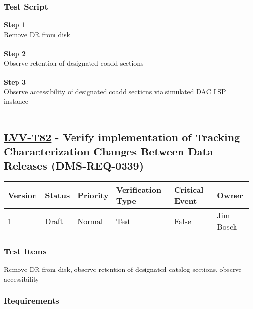 \hypertarget{test-script-171}{%
\subsubsection{Test Script}\label{test-script-171}}

\textbf{Step 1}\\
Remove DR from disk\\
~\\
\textbf{Step 2}\\
Observe retention of designated coadd sections\\
~\\
\textbf{Step 3}\\
Observe accessibility of designated coadd sections via simulated DAC LSP
instance\\
~\\

\hypertarget{lvv-t82---verify-implementation-of-tracking-characterization-changes-between-data-releases-dms-req-0339}{%
\subsection{\texorpdfstring{\href{https://jira.lsstcorp.org/secure/Tests.jspa\#/testCase/LVV-T82}{LVV-T82}
- Verify implementation of Tracking Characterization Changes Between
Data Releases
(DMS-REQ-0339)}{LVV-T82 - Verify implementation of Tracking Characterization Changes Between Data Releases (DMS-REQ-0339)}}\label{lvv-t82---verify-implementation-of-tracking-characterization-changes-between-data-releases-dms-req-0339}}

\begin{longtable}[]{@{}llllll@{}}
\toprule
Version & Status & Priority & Verification Type & Critical Event &
Owner\tabularnewline
\midrule
\endhead
1 & Draft & Normal & Test & False & Jim Bosch\tabularnewline
\bottomrule
\end{longtable}

\hypertarget{test-items-171}{%
\subsubsection{Test Items}\label{test-items-171}}

Remove DR from disk, observe retention of designated catalog sections,
observe accessibility

\hypertarget{requirements-172}{%
\subsubsection{Requirements}\label{requirements-172}}

